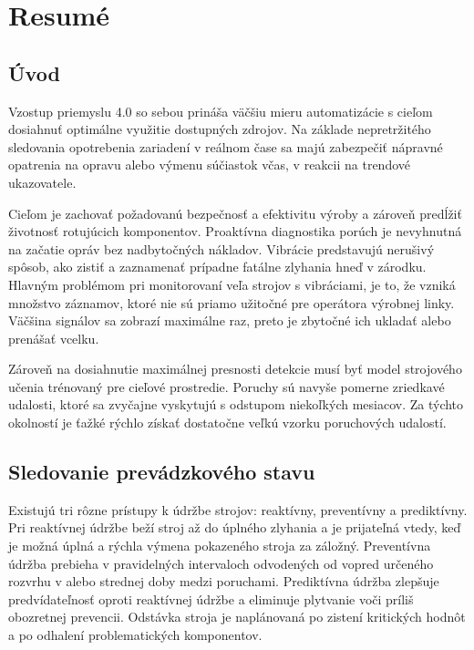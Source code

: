 \thispagestyle{empty}
\chapter{Resumé}
\renewcommand*{\thepage}{A-\arabic{page}}

\section{Úvod}
Vzostup priemyslu 4.0 so sebou prináša väčšiu mieru automatizácie s cieľom dosiahnuť optimálne využitie dostupných zdrojov. Na základe nepretržitého sledovania opotrebenia zariadení v reálnom čase sa majú zabezpečiť nápravné opatrenia na opravu alebo výmenu súčiastok včas, v reakcii na trendové ukazovatele. 

Cieľom je zachovať požadovanú bezpečnosť a efektivitu výroby a zároveň predĺžiť životnosť rotujúcich komponentov. Proaktívna diagnostika porúch je nevyhnutná na začatie opráv bez nadbytočných nákladov. Vibrácie predstavujú nerušivý spôsob, ako zistiť a zaznamenať prípadne fatálne zlyhania hneď v zárodku. Hlavným problémom pri monitorovaní veľa strojov s vibráciami, je to, že vzniká množstvo záznamov, ktoré nie sú priamo užitočné pre operátora výrobnej linky. Väčšina signálov sa zobrazí maximálne raz, preto je zbytočné ich ukladať alebo prenášať vcelku. 

Zároveň na dosiahnutie maximálnej presnosti detekcie musí byť model strojového učenia trénovaný pre cieľové prostredie. Poruchy sú navyše pomerne zriedkavé udalosti, ktoré sa zvyčajne vyskytujú s odstupom niekoľkých mesiacov. Za týchto okolností je ťažké rýchlo získať dostatočne veľkú vzorku poruchových udalostí.

\section{Sledovanie prevádzkového stavu}
Existujú tri rôzne prístupy k údržbe strojov: reaktívny, preventívny a prediktívny.
Pri reaktívnej údržbe beží stroj až do úplného zlyhania a je prijateľná vtedy, keď je možná úplná a rýchla výmena pokazeného stroja za záložný. Preventívna údržba prebieha v pravidelných intervaloch odvodených od vopred určeného rozvrhu v alebo strednej doby medzi poruchami. Prediktívna údržba zlepšuje predvídateľnosť oproti reaktívnej údržbe a eliminuje plytvanie voči príliš obozretnej prevencii. Odstávka stroja je naplánovaná po zistení kritických hodnôt a po odhalení problematických komponentov.

